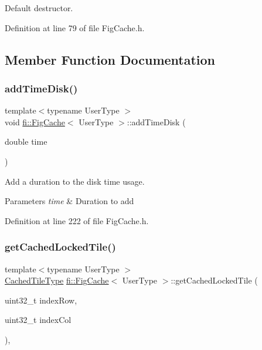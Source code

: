 Default destructor. 



Definition at line 79 of file Fig\+Cache.\+h.



\subsection{Member Function Documentation}
\mbox{\label{classfi_1_1FigCache_a9cead898e2afc1eb9b9f87cb14cf06c2}} 
\subsubsection{\texorpdfstring{add\+Time\+Disk()}{addTimeDisk()}}
{\footnotesize\ttfamily template$<$typename User\+Type $>$ \\
void \hyperlink{classfi_1_1FigCache}{fi\+::\+Fig\+Cache}$<$ User\+Type $>$\+::add\+Time\+Disk (\begin{DoxyParamCaption}\item[{double}]{time }\end{DoxyParamCaption})\hspace{0.3cm}{\ttfamily [inline]}}



Add a duration to the disk time usage. 


\begin{DoxyParams}{Parameters}
{\em time} & Duration to add \\
\hline
\end{DoxyParams}


Definition at line 222 of file Fig\+Cache.\+h.

\mbox{\label{classfi_1_1FigCache_affc8808f55b290811485aecef22573e6}} 
\subsubsection{\texorpdfstring{get\+Cached\+Locked\+Tile()}{getCachedLockedTile()}}
{\footnotesize\ttfamily template$<$typename User\+Type $>$ \\
\hyperlink{classfi_1_1FigCache_a7b9bbc4a832c01c3a461f573445c3c41}{Cached\+Tile\+Type} \hyperlink{classfi_1_1FigCache}{fi\+::\+Fig\+Cache}$<$ User\+Type $>$\+::get\+Cached\+Locked\+Tile (\begin{DoxyParamCaption}\item[{uint32\+\_\+t}]{index\+Row,  }\item[{uint32\+\_\+t}]{index\+Col }\end{DoxyParamCaption})\hspace{0.3cm}{\ttfamily [inline]}, {\ttfamily [private]}}



